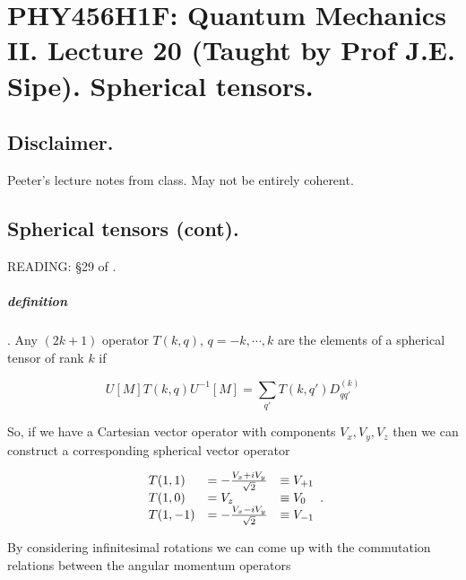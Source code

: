 
%

\chapter{PHY456H1F: Quantum Mechanics II.  Lecture 20 (Taught by Prof J.E. Sipe).  Spherical tensors.}
\label{chap:qmTwoL20}
{}
\date{Nov 21, 2011}

\beginArtWithToc

\section{Disclaimer.}

Peeter's lecture notes from class.  May not be entirely coherent.

\section{Spherical tensors (cont).}

READING: \S 29 of \cite{desai2009quantum}.

\paragraph{definition}.  Any $(2k + 1)$ operator $T(k, q)$, $q = -k, \cdots, k$ are the elements of a spherical tensor of rank $k$ if

\begin{equation}\label{eqn:qmTwoL20:10}
U[M] T(k, q) U^{-1}[M]
= \sum_{q'} T(k, q') D^{(k)}_{q q'}
\end{equation}

So, if we have a Cartesian vector operator with components $V_x, V_y, V_z$ then we can construct a corresponding spherical vector operator

\begin{equation}\label{eqn:qmTwoL20:30}
\begin{array}{l l l}
T(1, 1) &= - \frac{V_x + i V_y}{\sqrt{2}} &\equiv V_{+1} \\
T(1, 0) &= V_z &\equiv V_0 \\
T(1, -1) &= - \frac{V_x - i V_y}{\sqrt{2}} &\equiv V_{-1}
\end{array}.
\end{equation}

By considering infinitesimal rotations we can come up with the commutation relations between the angular momentum operators

